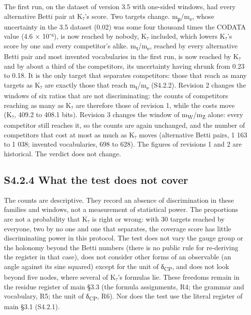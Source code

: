 \documentclass[11pt,a4paper]{article}
\begin{document}
The first run, on the dataset of version 3.5 with one-sided windows, had every alternative Betti pair at K₇'s score. Two targets change. m\textsubscript{μ}/m\textsubscript{e}, whose uncertainty in the 3.5 dataset (0.02) was some four thousand times the CODATA value (4.6 × 10⁻⁶), is now reached by nobody, K₇ included, which lowers K₇'s score by one and every competitor's alike. m\textsubscript{τ}/m\textsubscript{e}, reached by every alternative Betti pair and most invented vocabularies in the first run, is now reached by K₇ and by about a third of the competitors, its uncertainty having shrunk from 0.23 to 0.18. It is the only target that separates competitors: those that reach as many targets as K₇ are exactly those that reach m\textsubscript{τ}/m\textsubscript{e} (S4.2.2). Revision 2 changes the windows of six ratios that are not discriminating: the counts of competitors reaching as many as K₇ are therefore those of revision 1, while the costs move (K₇, 409.2 to 408.1 bits). Revision 3 changes the window of m\textsubscript{W}/m\textsubscript{Z} alone: every competitor still reaches it, so the counts are again unchanged, and the number of competitors that cost at most as much as K₇ moves (alternative Betti pairs, 1 163 to 1 038; invented vocabularies, 698 to 628). The figures of revisions 1 and 2 are historical. The verdict does not change.

\subsection{S4.2.4 What the test does not cover}\label{s4.2.4-what-the-test-does-not-cover}

The counts are descriptive. They record an absence of discrimination in these families and windows, not a measurement of statistical power. The proportions are not a probability that K₇ is right or wrong: with 30 targets reached by everyone, two by no one and one that separates, the coverage score has little discriminating power in this protocol. The test does not vary the gauge group or the holonomy beyond the Betti numbers (there is no public rule for re-deriving the register in that case), does not consider other forms of an observable (an angle against its sine squared) except for the unit of δ\textsubscript{CP}, and does not look beyond five nodes, where several of K₇'s formulas lie. These freedoms remain in the residue register of main §3.3 (the formula assignments, R4; the grammar and vocabulary, R5; the unit of δ\textsubscript{CP}, R6). Nor does the test use the literal register of main §3.1 (S4.2.1).
\end{document}
